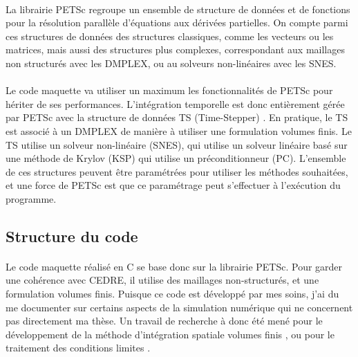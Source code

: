     \paragraph{}
    La librairie PETSc \cite{petsc-web-page, petsc-user-ref, petsc-efficient} regroupe un ensemble de structure de données et de fonctions pour la résolution parallèle d'équations aux dérivées partielles.
    On compte parmi ces structures de données des structures classiques, comme les vecteurs ou les matrices, mais aussi des structures plus complexes, correspondant aux maillages non structurés avec les DMPLEX, ou au solveurs non-linéaires avec les SNES.

    \paragraph{}
    Le code maquette va utiliser un maximum les fonctionnalités de PETSc pour hériter de ses performances.
    L'intégration temporelle est donc entièrement gérée par PETSc avec la structure de données TS (Time-Stepper) \cite{AbhyankarBrownConstantinescuEtAl2018}.
    En pratique, le TS est associé à un DMPLEX de manière à utiliser une formulation volumes finis.
    Le TS utilise un solveur non-linéaire (SNES), qui utilise un solveur linéaire basé sur une méthode de Krylov (KSP) qui utilise un préconditionneur (PC).
    L'ensemble de ces structures peuvent être paramétrées pour utiliser les méthodes souhaitées, et une force de PETSc est que ce paramétrage peut s'effectuer à l’exécution du programme.


  \subsection{Structure du code}

    \paragraph{}
    Le code maquette réalisé en C se base donc sur la librairie PETSc.
    Pour garder une cohérence avec CEDRE, il utilise des maillages non-structurés, et une formulation volumes finis.
    Puisque ce code est développé par mes soins, j'ai du me documenter sur certains aspects de la simulation numérique qui ne concernent pas directement ma thèse.
    Un travail de recherche à donc été mené pour le développement de la méthode d'intégration spatiale volumes finis \cite{EymardGallouetHerbin2000}, ou pour le traitement des conditions limites \cite{PoinsotLele1992}.

